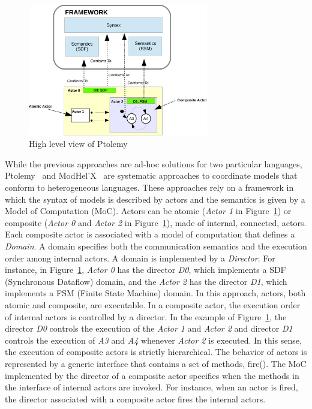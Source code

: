 \begin{figure}[ht!]
	\begin{center}
		\includegraphics[width=0.7\textwidth]{background/figs/ptolemyfig}
		\caption{High level view of Ptolemy~\cite{giraultbib}}
		\label{fig:ptolemyfig}
	\end{center}
\end{figure}

While the previous approaches are ad-hoc solutions for two particular languages, Ptolemy~\cite{ptoleframebib} and ModHel'X~\cite{modhelxbib} are systematic approaches to coordinate models that conform to heterogeneous languages. These approaches rely on a framework in which the syntax of models is described by actors and the semantics is given by a Model of Computation (MoC). Actors can be atomic (\eg \emph{Actor 1} in Figure~\ref{fig:ptolemyfig}) or composite (\eg \emph{Actor 0} and \emph{Actor 2} in Figure~\ref{fig:ptolemyfig}), \ie made of internal, connected, actors. Each composite actor is associated with a model of computation that defines a \emph{Domain}. A domain specifies both the communication semantics and the execution order among internal actors. A domain is implemented by a \emph{Director}. For instance, in Figure~\ref{fig:ptolemyfig}, \emph{Actor 0} has the director \emph{D0}, which implements a SDF (Synchronous Dataflow) domain, and the \emph{Actor 2} has the director \emph{D1}, which implements a FSM (Finite State Machine) domain. In this approach, actors, both atomic and composite, are executable. In a composite actor, the execution order of internal actors is controlled by a director. In the example of Figure~\ref{fig:ptolemyfig}, the director \emph{D0} controls the execution of the \emph{Actor 1} and \emph{Actor 2} and director \emph{D1} controls the execution of \emph{A3} and \emph{A4} whenever \emph{Actor 2} is executed. In this sense, the execution of composite actors is strictly hierarchical. The behavior of actors is represented by a generic interface that contains a set of methods, \eg fire(). The MoC implemented by the director of a composite actor specifies when the methods in the interface of internal actors are invoked. For instance, when an actor is fired, the director associated with a composite actor fires the internal actors. 

